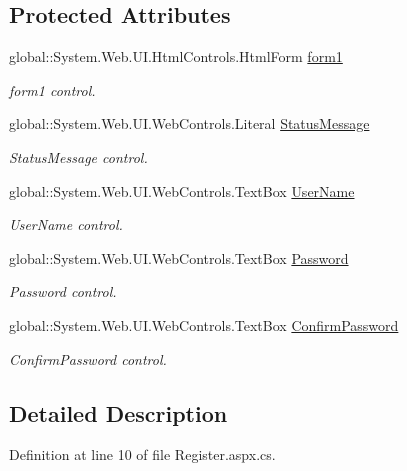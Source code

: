 \subsection*{Protected Attributes}
\begin{DoxyCompactItemize}
\item 
global\+::\+System.\+Web.\+U\+I.\+Html\+Controls.\+Html\+Form \hyperlink{class_website_1_1_register_ac0b3a35ad4ca980bf80cb5bbabfedf8a}{form1}
\begin{DoxyCompactList}\small\item\em form1 control. \end{DoxyCompactList}\item 
global\+::\+System.\+Web.\+U\+I.\+Web\+Controls.\+Literal \hyperlink{class_website_1_1_register_ad6b033d11223099045071793a539ff7f}{Status\+Message}
\begin{DoxyCompactList}\small\item\em Status\+Message control. \end{DoxyCompactList}\item 
global\+::\+System.\+Web.\+U\+I.\+Web\+Controls.\+Text\+Box \hyperlink{class_website_1_1_register_a76706d63e50874d2759d6a1977fa5615}{User\+Name}
\begin{DoxyCompactList}\small\item\em User\+Name control. \end{DoxyCompactList}\item 
global\+::\+System.\+Web.\+U\+I.\+Web\+Controls.\+Text\+Box \hyperlink{class_website_1_1_register_a90fa0de877498ce7b5c52a107bf9eff6}{Password}
\begin{DoxyCompactList}\small\item\em Password control. \end{DoxyCompactList}\item 
global\+::\+System.\+Web.\+U\+I.\+Web\+Controls.\+Text\+Box \hyperlink{class_website_1_1_register_a7b20715acbc63ef7ee2a9e70dae089f9}{Confirm\+Password}
\begin{DoxyCompactList}\small\item\em Confirm\+Password control. \end{DoxyCompactList}\end{DoxyCompactItemize}


\subsection{Detailed Description}


Definition at line 10 of file Register.\+aspx.\+cs.



